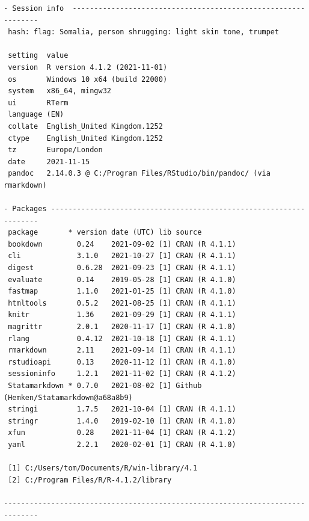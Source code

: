 \documentclass[
  10pt,
]{book}
\begin{document}
\begin{verbatim}
- Session info  --------------------------------------------------------------
 hash: flag: Somalia, person shrugging: light skin tone, trumpet

 setting  value
 version  R version 4.1.2 (2021-11-01)
 os       Windows 10 x64 (build 22000)
 system   x86_64, mingw32
 ui       RTerm
 language (EN)
 collate  English_United Kingdom.1252
 ctype    English_United Kingdom.1252
 tz       Europe/London
 date     2021-11-15
 pandoc   2.14.0.3 @ C:/Program Files/RStudio/bin/pandoc/ (via rmarkdown)

- Packages -------------------------------------------------------------------
 package       * version date (UTC) lib source
 bookdown        0.24    2021-09-02 [1] CRAN (R 4.1.1)
 cli             3.1.0   2021-10-27 [1] CRAN (R 4.1.1)
 digest          0.6.28  2021-09-23 [1] CRAN (R 4.1.1)
 evaluate        0.14    2019-05-28 [1] CRAN (R 4.1.0)
 fastmap         1.1.0   2021-01-25 [1] CRAN (R 4.1.0)
 htmltools       0.5.2   2021-08-25 [1] CRAN (R 4.1.1)
 knitr           1.36    2021-09-29 [1] CRAN (R 4.1.1)
 magrittr        2.0.1   2020-11-17 [1] CRAN (R 4.1.0)
 rlang           0.4.12  2021-10-18 [1] CRAN (R 4.1.1)
 rmarkdown       2.11    2021-09-14 [1] CRAN (R 4.1.1)
 rstudioapi      0.13    2020-11-12 [1] CRAN (R 4.1.0)
 sessioninfo     1.2.1   2021-11-02 [1] CRAN (R 4.1.2)
 Statamarkdown * 0.7.0   2021-08-02 [1] Github (Hemken/Statamarkdown@a68a8b9)
 stringi         1.7.5   2021-10-04 [1] CRAN (R 4.1.1)
 stringr         1.4.0   2019-02-10 [1] CRAN (R 4.1.0)
 xfun            0.28    2021-11-04 [1] CRAN (R 4.1.2)
 yaml            2.2.1   2020-02-01 [1] CRAN (R 4.1.0)

 [1] C:/Users/tom/Documents/R/win-library/4.1
 [2] C:/Program Files/R/R-4.1.2/library

------------------------------------------------------------------------------
\end{verbatim}

  

\backmatter
\end{document}
